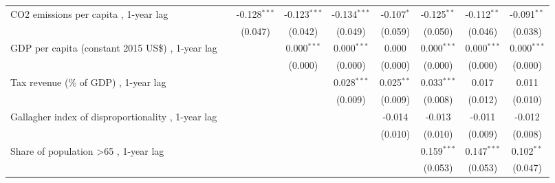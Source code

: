 \begin{table}[htbp]
\begin{tabular}{lcccccccc}
      CO2 emissions per capita , 1-year lag                                                               &                & -0.128$^{***}$ & -0.123$^{***}$ & -0.134$^{***}$ & -0.107$^{*}$  & -0.125$^{**}$ & -0.112$^{**}$ & -0.091$^{**}$\\   
                                                                                                          &                & (0.047)        & (0.042)        & (0.049)        & (0.059)       & (0.050)       & (0.046)       & (0.038)\\   
      GDP per capita (constant 2015 US\$) , 1-year lag                                                    &                &                & 0.000$^{***}$  & 0.000$^{***}$  & 0.000         & 0.000$^{***}$ & 0.000$^{***}$ & 0.000$^{***}$\\   
                                                                                                          &                &                & (0.000)        & (0.000)        & (0.000)       & (0.000)       & (0.000)       & (0.000)\\   
      Tax revenue (\% of GDP) , 1-year lag                                                                &                &                &                & 0.028$^{***}$  & 0.025$^{**}$  & 0.033$^{***}$ & 0.017         & 0.011\\   
                                                                                                          &                &                &                & (0.009)        & (0.009)       & (0.008)       & (0.012)       & (0.010)\\   
      Gallagher index of disproportionality , 1-year lag                                                  &                &                &                &                & -0.014        & -0.013        & -0.011        & -0.012\\   
                                                                                                          &                &                &                &                & (0.010)       & (0.010)       & (0.009)       & (0.008)\\   
      Share of population >65 , 1-year lag                                                                &                &                &                &                &               & 0.159$^{***}$ & 0.147$^{***}$ & 0.102$^{**}$\\   
                                                                                                          &                &                &                &                &               & (0.053)       & (0.053)       & (0.047)\\   

\end{tabular}
\end{table}
